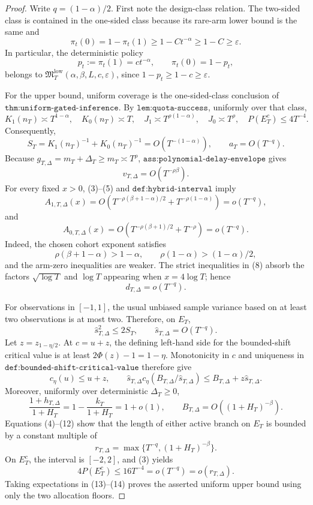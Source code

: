 \documentclass{article}
\begin{document}
\begin{proof}
Write \(q=(1-\alpha)/2\).  First note the design-class relation.  The two-sided class is contained in the one-sided class because its rare-arm lower bound is the same and
\[
 \pi_t(0)=1-\pi_t(1)\geq1-Ct^{-\alpha}\geq1-C\geq\varepsilon.
 \tag{1}
\]
In particular, the deterministic policy
\[
 p_t:=\pi_t(1)=ct^{-\alpha},
 \qquad \pi_t(0)=1-p_t,
 \tag{2}
\]
belongs to \(\mathfrak M_T^{\mathrm{low}}(\alpha,\beta,L,c,\varepsilon)\), since \(1-p_t\geq1-c\geq\varepsilon\).

For the upper bound, uniform coverage is the one-sided-class conclusion of \(\texttt{thm:uniform-gated-inference}\).  By \(\texttt{lem:quota-success}\), uniformly over that class,
\[
 K_1(n_T)\asymp T^{1-\alpha},\quad K_0(n_T)\asymp T,
 \quad J_1\asymp T^{\rho(1-\alpha)},\quad J_0\asymp T^\rho,
 \quad P(E_T^c)\leq4T^{-4}.
 \tag{3}
\]
Consequently,
\[
 S_T=K_1(n_T)^{-1}+K_0(n_T)^{-1}=O(T^{-(1-\alpha)}),
 \qquad a_T=O(T^{-q}).
 \tag{4}
\]
Because \(g_{T,\Delta}=m_T+\Delta_T\geq m_T\asymp T^\rho\), \(\texttt{ass:polynomial-delay-envelope}\) gives
\[
 v_{T,\Delta}=O(T^{-\rho\beta}).
 \tag{5}
\]
For every fixed \(x>0\), (3)--(5) and \(\texttt{def:hybrid-interval}\) imply
\[
 A_{1,T,\Delta}(x)
 =O\!\left(T^{-\rho(\beta+1-\alpha)/2}
          +T^{-\rho(1-\alpha)}\right)=o(T^{-q}),
 \tag{6}
\]
and
\[
 A_{0,T,\Delta}(x)
 =O\!\left(T^{-\rho(\beta+1)/2}+T^{-\rho}\right)=o(T^{-q}).
 \tag{7}
\]
Indeed, the chosen cohort exponent satisfies
\[
 \rho(\beta+1-\alpha)>1-\alpha,
 \qquad \rho(1-\alpha)>(1-\alpha)/2,
 \tag{8}
\]
and the arm-zero inequalities are weaker.  The strict inequalities in (8) absorb the factors \(\sqrt{\log T}\) and \(\log T\) appearing when \(x=4\log T\); hence
\[
 d_{T,\Delta}=o(T^{-q}).
 \tag{9}
\]

For observations in \([-1,1]\), the usual unbiased sample variance based on at least two observations is at most two.  Therefore, on \(E_T\),
\[
 \widehat s_{T,\Delta}^2\leq2S_T,
 \qquad \widehat s_{T,\Delta}=O(T^{-q}).
 \tag{10}
\]
Let \(z=z_{1-\eta/2}\).  At \(c=u+z\), the defining left-hand side for the bounded-shift critical value is at least
\(2\Phi(z)-1=1-\eta\).  Monotonicity in \(c\) and uniqueness in \(\texttt{def:bounded-shift-critical-value}\) therefore give
\[
 c_\eta(u)\leq u+z,
 \qquad
 \widehat s_{T,\Delta}c_\eta(B_{T,\Delta}/\widehat s_{T,\Delta})
 \leq B_{T,\Delta}+z\widehat s_{T,\Delta}.
 \tag{11}
\]
Moreover, uniformly over deterministic \(\Delta_T\geq0\),
\[
 \frac{1+h_{T,\Delta}}{1+H_T}
 =1-\frac{k_T}{1+H_T}=1+o(1),
 \qquad
 B_{T,\Delta}=O((1+H_T)^{-\beta}).
 \tag{12}
\]
Equations (4)--(12) show that the length of either active branch on \(E_T\) is bounded by a constant multiple of
\[
 r_{T,\Delta}=\max\{T^{-q},(1+H_T)^{-\beta}\}.
 \tag{13}
\]
On \(E_T^c\), the interval is \([-2,2]\), and (3) yields
\[
 4P(E_T^c)\leq16T^{-4}=o(T^{-q})=o(r_{T,\Delta}).
 \tag{14}
\]
Taking expectations in (13)--(14) proves the asserted uniform upper bound using only the two allocation floors.


\end{proof}
\end{document}
